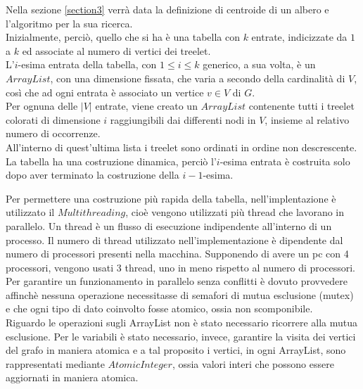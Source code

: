 Nella sezione \ref{section3} verr\`a data la definizione di centroide di un albero e l'algoritmo per la sua ricerca.\\
Inizialmente, perci\`o, quello che si ha \`e una tabella con $ k $ entrate, indicizzate da $ 1 $ a $ k $ ed associate al numero di vertici dei treelet.\\
L'$ i $-esima entrata della tabella, con $ 1\le i \le k $ generico, a sua volta, \`e un $ ArrayList $, con una dimensione fissata, che varia a secondo della cardinalit\`a di $ V $, cos\`i che ad ogni entrata \`e associato un vertice $ v\in V $ di $ G $.\\
Per ognuna delle $ |V| $ entrate, viene creato un $ ArrayList $ contenente tutti i treelet colorati di dimensione $ i $ raggiungibili dai differenti nodi in $ V $, insieme al relativo numero di occorrenze.\\
All'interno di quest'ultima lista i treelet sono ordinati in ordine non descrescente.\\
La tabella ha una costruzione dinamica, perci\`o l'$ i $-esima entrata \`e costruita solo dopo aver terminato la costruzione della $ i-1 $-esima.

Per permettere una costruzione pi\`u rapida della tabella, nell'implentazione \`e utilizzato il $ Multithreading $, cio\`e vengono utilizzati pi\`u thread che lavorano in parallelo.
Un thread \`e un flusso di esecuzione indipendente all'interno di un processo.
Il numero di thread utilizzato nell'implementazione \`e dipendente dal numero di processori presenti nella macchina.
Supponendo di avere un pc con 4 processori, vengono usati 3 thread, uno in meno rispetto al numero di processori.
Per garantire un funzionamento in parallelo senza conflitti \`e dovuto provvedere affinch\`e nessuna operazione necessitasse di semafori di mutua esclusione (mutex) e che ogni tipo di dato coinvolto fosse atomico, ossia non scomponibile.\\
Riguardo le operazioni sugli ArrayList non \`e stato necessario ricorrere alla mutua esclusione.
Per le variabili \`e stato necessario, invece, garantire la visita dei vertici del grafo in maniera atomica e a tal proposito i vertici, in ogni ArrayList, sono rappresentati mediante $ AtomicInteger $, ossia valori interi che possono essere aggiornati in maniera atomica.\mbox{}\\



	
